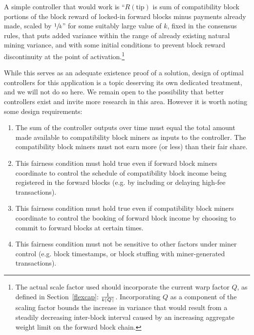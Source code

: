 A simple controller that would work is ``$R(\mathrm{tip})$ is sum of
compatibility block portions of the block reward of locked-in forward
blocks minus payments already made, scaled by $\sfrac{1}{k}$'' for
some suitably large value of $k$, fixed in the consensus rules, that
puts added variance within the range of already existing natural
mining variance, and with some initial conditions to prevent block
reward discontinuity at the point of activation.\footnote{The actual
  scale factor used should incorporate the current warp factor $Q$, as
  defined in Section~\ref{flexcap}: $\frac{1}{k\lceil Q\rceil}$.
  Incorporating $Q$ as a component of the scaling factor bounds the
  increase in variance that would result from a steadily decreasing
  inter-block interval caused by an increasing aggregate weight limit
  on the forward block chain.}

While this serves as an adequate existence proof of a solution, design
of optimal controllers for this application is a topic deserving its
own dedicated treatment, and we will not do so here.  We remain open
to the possibility that better controllers exist and invite more
research in this area.  However it is worth noting some design
requirements:

\begin{enumerate}
  \item
    The sum of the controller outputs over time must equal the total
    amount made available to compatibility block miners as inputs to
    the controller.  The compatibility block miners must not earn more
    (or less) than their fair share.

  \item
    This fairness condition must hold true even if forward block
    miners coordinate to control the schedule of compatibility block
    income being registered in the forward blocks (e.g. by including
    or delaying high-fee transactions).

  \item
    This fairness condition must hold true even if compatibility block
    miners coordinate to control the booking of forward block income
    by choosing to commit to forward blocks at certain times.

  \item
    This fairness condition must not be sensitive to other factors
    under miner control (e.g. block timestamps, or block stuffing with
    miner-generated transactions).
\end{enumerate}

